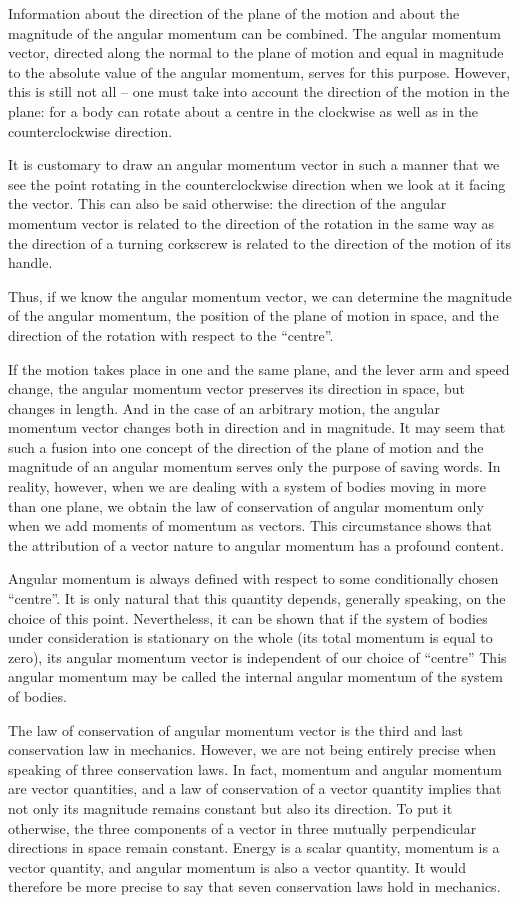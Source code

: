Information about the direction of the plane of the
motion and about the magnitude of the angular momentum can be combined. The angular momentum vector,
directed along the normal to the plane of motion and
equal in magnitude to the absolute value of the angular
momentum, serves for this purpose. However, this is
still not all -- one must take into account the direction
of the motion in the plane: for a body can rotate about a
centre in the clockwise as well as in the counterclockwise
direction.

It is customary to draw an angular momentum vector
in such a manner that we see the point rotating in the
counterclockwise direction when we look at it facing the
vector. This can also be said otherwise: the direction of
the angular momentum vector is related to the direction
of the rotation in the same way as the direction of a turning corkscrew is related to the direction of the motion of
its handle.

Thus, if we know the angular momentum vector, we
can determine the magnitude of the angular momentum,
the position of the plane of motion in space, and the direction of the rotation with respect to the ``centre''.

If the motion takes place in one and the same plane,
and the lever arm and speed change, the angular momentum vector preserves its direction in space, but changes
in length. And in the case of an arbitrary motion, the
angular momentum vector changes both in direction and
in magnitude. It may seem that such a fusion into one
concept of the direction of the plane of motion and the
magnitude of an angular momentum serves only the purpose
of saving words. In reality, however, when we are dealing
with a system of bodies moving in more than one plane,
we obtain the law of conservation of angular momentum
only when we add moments of momentum as vectors.
This circumstance shows that the attribution of a vector nature to angular momentum has a profound content.


Angular momentum is always defined with respect to
some conditionally chosen ``centre''. It is only natural that
this quantity depends, generally speaking, on the choice
of this point. Nevertheless, it can be shown that if the
system of bodies under consideration is stationary on the
whole (its total momentum is equal to zero), its angular
momentum vector is independent of our choice of  ``centre''
This angular momentum may be called the internal angular momentum of the system of bodies.

The law of conservation of angular momentum vector
is the third and last conservation law in mechanics. However, we are not being entirely precise when speaking of
three conservation laws. In fact, momentum and angular
momentum are vector quantities, and a law of conservation of a vector quantity implies that not only its magnitude remains constant but also its direction. To put it otherwise, the three components of a vector in three mutually perpendicular directions in space remain constant. Energy is a scalar quantity, momentum is a vector quantity, and angular momentum is also a vector quantity. It would therefore be more precise to say that seven conservation laws hold in mechanics.

